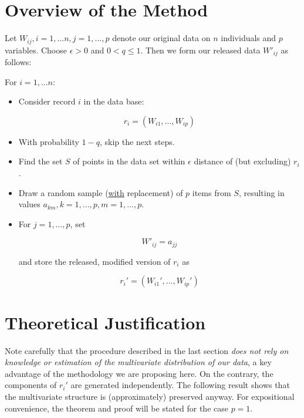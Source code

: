 \documentclass[11pt]{article}
\begin{document}
\section{Overview of the Method}
\label{overview}

Let $W_{ij}, i = 1,...n, j = 1,...,p$ denote our original data on $n$
individuals and $p$ variables.  Choose $\epsilon > 0$ and $0 < q \leq
1$.  Then we form our released data $W'_{ij}$ as follows:

For $i = 1,...n$:

\begin{itemize}

\item Consider record $i$ in the data base:

\begin{equation}
r_i = (W_{i1},...,W_{ip})
\end{equation}

\item With probability $1-q$, skip the next steps.

\item Find the set $S$ of points in the data set within $\epsilon$
distance of (but excluding) $r_i$.

\item Draw a random sample (\underline{with} replacement) of $p$ items
from $S$, resulting in values $a_{km}, k = 1,...,p, m = 1,...,p$.

\item For $j = 1,...,p$, set 

\begin{equation}
W'_{ij} = a_{jj}
\end{equation}

and store the released, modified version of $r_i$ as

\begin{equation}
r_i' = 
(W_{i1}',...,W_{ip}')
\end{equation}

\end{itemize}

\section{Theoretical Justification}

Note carefully that the procedure described in the last section {\it
does not rely on knowledge or estimation of the multivariate
distribution of our data}, a key advantage of the methodology we are
proposing here.  On the contrary, the components of $r_i'$ are generated
independently.  The following result shows that the multivariate
structure is (approximately) preserved anyway.  For expositional
convenience, the theorem and proof will be stated for the case $p = 1$.
\end{document}
